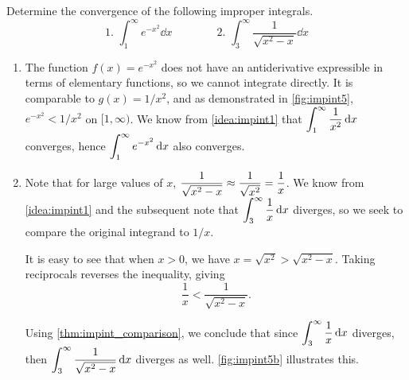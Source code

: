 \begin{example}\label{ex_impint5}%
Determine the convergence of the following improper integrals.
\[
 \text{1. }\int_1^\infty e^{-x^2}\dd x\qquad\qquad
 \text{2. }\int_3^\infty \frac{1}{\sqrt{x^2-x}}\dd x
\]
\solution
\begin{enumerate}
\item		The function $f(x) = e^{-x^2}$ does not have an antiderivative expressible in terms of elementary functions, so we cannot integrate directly. It is comparable to $g(x)=1/x^2$, and as demonstrated in \autoref{fig:impint5}, $e^{-x^2} < 1/x^2$ on $[1,\infty)$. We know from \autoref{idea:impint1} that $\displaystyle \int_1^\infty \frac{1}{x^2}\operatorname{d}\! x$ converges, hence $\displaystyle\int_1^\infty e^{-x^2}\operatorname{d}\! x$ also converges.


\item		Note that for large values of $x$, $\displaystyle \frac{1}{\sqrt{x^2-x}} \approx \frac{1}{\sqrt{x^2}} =\frac{1}{x}$. We know from \autoref{idea:impint1} and the subsequent note that  $\displaystyle \int_3^\infty \frac1x\operatorname{d}\! x$ diverges, so we seek to compare the original integrand to $1/x$.

It is easy to see that when $x>0$, we have $x = \sqrt{x^2} > \sqrt{x^2-x}$. Taking reciprocals reverses the inequality, giving
\[\frac1x < \frac1{\sqrt{x^2-x}}.\]

Using \autoref{thm:impint_comparison}, we conclude that since $\displaystyle\int_3^\infty\frac1x\operatorname{d}\! x$ diverges, then $\displaystyle\int_3^\infty\frac1{\sqrt{x^2-x}}\operatorname{d}\! x$ diverges as well. \autoref{fig:impint5b} illustrates this.


\end{enumerate}
\end{example}
